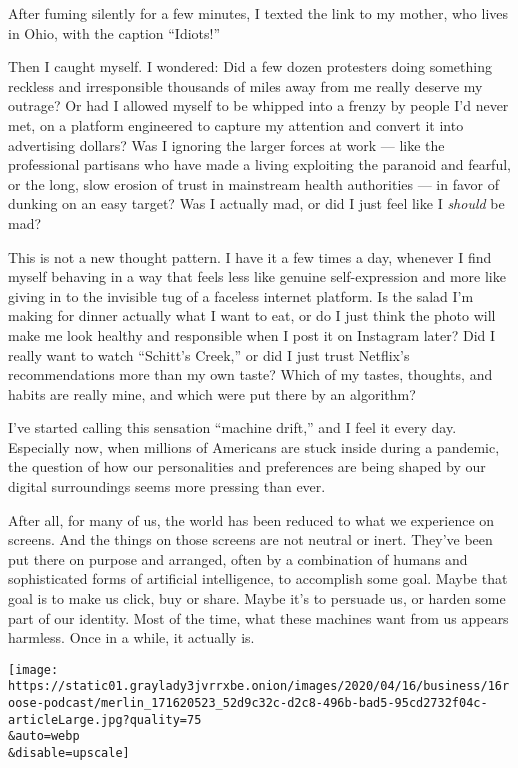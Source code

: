 After fuming silently for a few minutes, I texted the link to my mother,
who lives in Ohio, with the caption ``Idiots!''

Then I caught myself. I wondered: Did a few dozen protesters doing
something reckless and irresponsible thousands of miles away from me
really deserve my outrage? Or had I allowed myself to be whipped into a
frenzy by people I'd never met, on a platform engineered to capture my
attention and convert it into advertising dollars? Was I ignoring the
larger forces at work --- like the professional partisans who have made
a living exploiting the paranoid and fearful, or the long, slow erosion
of trust in mainstream health authorities --- in favor of dunking on an
easy target? Was I actually mad, or did I just feel like I \emph{should}
be mad?

This is not a new thought pattern. I have it a few times a day, whenever
I find myself behaving in a way that feels less like genuine
self-expression and more like giving in to the invisible tug of a
faceless internet platform. Is the salad I'm making for dinner actually
what I want to eat, or do I just think the photo will make me look
healthy and responsible when I post it on Instagram later? Did I really
want to watch ``Schitt's Creek,'' or did I just trust Netflix's
recommendations more than my own taste? Which of my tastes, thoughts,
and habits are really mine, and which were put there by an algorithm?

I've started calling this sensation ``machine drift,'' and I feel it
every day. Especially now, when millions of Americans are stuck inside
during a pandemic, the question of how our personalities and preferences
are being shaped by our digital surroundings seems more pressing than
ever.

After all, for many of us, the world has been reduced to what we
experience on screens. And the things on those screens are not neutral
or inert. They've been put there on purpose and arranged, often by a
combination of humans and sophisticated forms of artificial
intelligence, to accomplish some goal. Maybe that goal is to make us
click, buy or share. Maybe it's to persuade us, or harden some part of
our identity. Most of the time, what these machines want from us appears
harmless. Once in a while, it actually is.

\texttt{[image: https://static01.graylady3jvrrxbe.onion/images/2020/04/16/business/16roose-podcast/merlin\_171620523\_52d9c32c-d2c8-496b-bad5-95cd2732f04c-articleLarge.jpg?quality=75\\\&auto=webp\\\&disable=upscale]}


